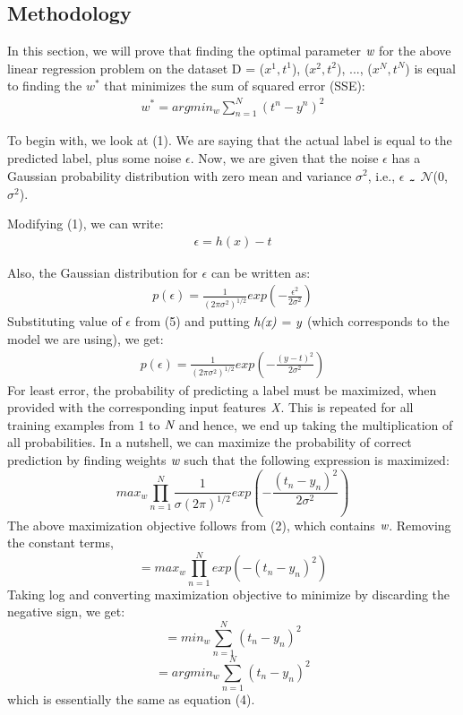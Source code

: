 \documentclass{article}
\newcommand\thicktilde{{\lower.74ex\hbox{\texttt{\char`\~}}}}
\begin{document}
\subsection{Methodology}
In this section, we will prove that finding the optimal parameter $\emph{w}$ for the above linear regression problem on the dataset D = {($x^1, t^1$), ($x^2, t^2$), ..., ($x^N, t^N$)} is equal to finding the $w^*$ that minimizes the sum of squared error (SSE):
\begin{align}
w^* = argmin_w \sum_{n=1}^N(t^n - y^n)^2 
\end{align}

To begin with, we look at (1). We are saying that the actual label is equal to the predicted label, plus some noise $\epsilon$. Now, we are given that the noise $\epsilon$ has a Gaussian probability distribution with zero mean and variance $\sigma^2$, i.e., $\epsilon$ $\thicktilde$ $\mathcal{N}$(0, $\sigma^2$). 

Modifying (1), we can write:
\begin{align}
\epsilon  = h(x) - t
\end{align}

Also, the Gaussian distribution for $\epsilon$ can be written as:
\begin{align}
p(\epsilon) = \frac{1}{(2\pi\sigma^2)^{1/2}}exp(- \frac{\epsilon^2}{2\sigma^2})
\end{align}
Substituting value of $\epsilon$ from (5) and putting $\emph{h(x)}$ = $\emph{y}$ (which corresponds to the model we are using), we get:
\begin{align}
p(\epsilon) = \frac{1}{(2\pi\sigma^2)^{1/2}}exp(- \frac{(y - t)^2}{2\sigma^2})
\end{align}
For least error, the probability of predicting a label must be maximized, when provided with the corresponding input features $\emph{X}$. This is repeated for all training examples from 1 to $\emph{N}$ and hence, we end up taking the multiplication of all probabilities. In a nutshell, we can maximize the probability of correct prediction by finding weights $\emph{w}$ such that the following expression is maximized:
$$max_{w} \prod_{n=1}^N \frac{1}{\sigma (2\pi)^{1/2}}exp(-\frac{(t_n - y_n)^2}{2\sigma^2})$$
The above maximization objective follows from (2), which contains $\emph{w}$. Removing the constant terms,
$$=max_{w} \prod_{n=1}^N exp(-(t_n - y_n)^2)$$
Taking log and converting maximization objective to minimize by discarding the negative sign, we get:
$$=min_{w} \sum_{n=1}^N (t_n - y_n)^2$$
$$=argmin_{w} \sum_{n=1}^N (t_n - y_n)^2$$
which is essentially the same as equation (4).
\end{document}
